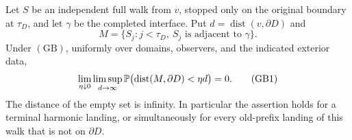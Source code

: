 \begin{lemma}
\label{g:boundary-landing}
Let \(S\) be an independent full walk from \(v\), stopped only on
the original boundary at \(\tau_D\), and let \(\gamma\) be the
completed interface. Put \(d=\operatorname{dist}(v,\partial D)\) and
\[
 M=\{S_j:j<\tau_D,\ S_j\text{ is adjacent to }\gamma\}.
\]
Under \((\mathrm{GB})\), uniformly over domains, observers, and the
indicated exterior data,
\[
 \lim_{\eta\downarrow0}\limsup_{d\to\infty}
 \mathbb P\bigl(\operatorname{dist}(M,\partial D)<\eta d\bigr)=0.
 \tag{GB1}
\]
The distance of the empty set is infinity. In particular the assertion
holds for a terminal harmonic landing, or simultaneously for every
old-prefix landing of this walk that is not on \(\partial D\).
\end{lemma}

